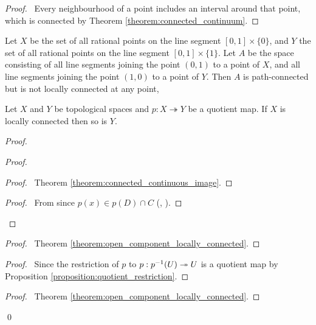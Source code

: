 \begin{proof}
    \pf\ Every neighbourhood of a point includes an interval around that point, which is connected 
    by Theorem \ref{theorem:connected_continuum}.
\end{proof}

\begin{example}
    Let $X$ be the set of all rational points on the line segment $[0,1] \times \{0\}$,
    and $Y$ the set of all rational points on the line segment $[0,1] \times \{1\}$.
    Let $A$ be the space consisting of all line segments joining the point $(0,1)$ to a point
    of $X$, and all line segments joining the point $(1,0)$ to a point of $Y$. Then $A$ is
    path-connected but is not locally connected at any point,
\end{example}

\begin{proposition}
    Let $X$ and $Y$ be topological spaces and $p : X \twoheadrightarrow Y$ be a quotient map. If $X$ is locally connected then so is $Y$.
\end{proposition}

\begin{proof}
    \pf
    \begin{proof}
        \begin{proof}
            \pf\ Theorem \ref{theorem:connected_continuous_image}.
        \end{proof}
        \begin{proof}
            \pf\ From  since $p(x) \in p(D) \cap C$ (, ).
        \end{proof}
    \end{proof}
    \begin{proof}
        \pf\ Theorem \ref{theorem:open_component_locally_connected}.
    \end{proof}
    \begin{proof}
        \pf\ Since the restriction of $p$ to $p : {p}^{-1}(U) \twoheadrightarrow U$
        is a quotient map by Proposition \ref{proposition:quotient_restriction}.
    \end{proof}
    \qedstep
    \begin{proof}
        \pf\ Theorem \ref{theorem:open_component_locally_connected}.
    \end{proof}
    \qed
\end{proof}

